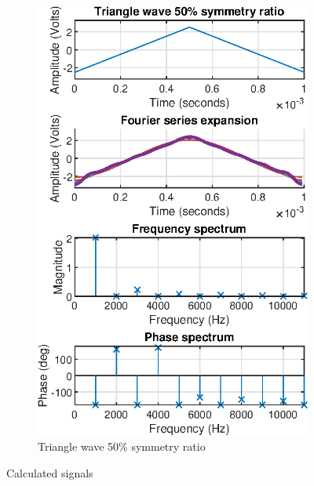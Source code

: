 \documentclass[notitlepage, a4paper, 11pt]{article}
\begin{document}
\begin{figure}[H]
\begin{subfigure}[][][t]{0.23\textwidth}
			\includegraphics[width=\textwidth]{../Matlab/img/tri50}
			\caption{Triangle wave 50\% symmetry ratio}
		\end{subfigure}
		\caption{Calculated signals}
		\label{fig:pure-signals}
	\end{figure}
	
\end{document}
